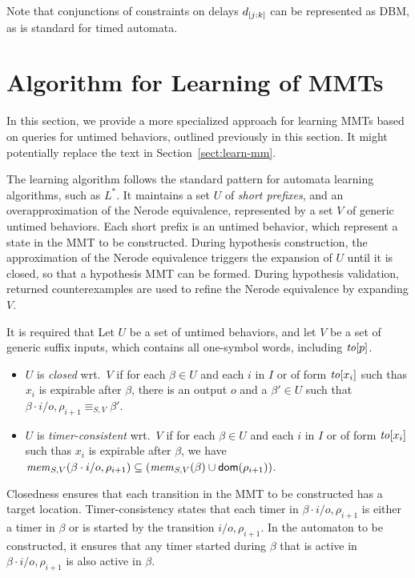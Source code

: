   Note that conjunctions of constraints on delays $\delay{j}{k}$ can be represented as DBM, as is standard for timed automata.

\section{Algorithm for Learning of MMTs}

In this section, we provide a more specialized approach for learning MMTs based
on queries for untimed behaviors, outlined previously in this section.
It might potentially replace the text in Section~\ref{sect:learn-mm}.

The learning algorithm follows the standard pattern for automata learning
algorithms, such as $L^*$. It maintains
a set $U$ of {\em short prefixes}, and
  an overapproximation of the Nerode equivalence,
  represented by a set $V$ of generic untimed behaviors.
  Each short prefix is an untimed
behavior, which represent a state in the MMT to be constructed.
During hypothesis construction,
the approximation of the Nerode equivalence triggers the expansion of
$U$ until it is closed, so that a hypothesis MMT can be formed.
During hypothesis validation, returned counterexamples are used to refine
the Nerode equivalence by expanding $V$.

It is required that 
Let $U$ be a set of untimed behaviors, and let $V$ be a set of generic suffix
inputs, which contains all one-symbol words, including $\toevent{p}$.
\begin{itemize}
\item
$U$ is {\em closed} wrt.\ $V$ if 
  for each $\beta \in U$ and each
  $i$ in $I$ or of form $\toevent{x_i}$ such thas $x_i$ is expirable
  after $\beta$,
  there is an output $o$ and a $\beta' \in U$ such that
  $\beta \cdot i/o,\rho_{i+1} \equiv_{S,V} \beta'$.
\item
$U$ is {\em timer-consistent} wrt.\ $V$ if 
  for each $\beta \in U$ and each
  $i$ in $I$ or of form $\toevent{x_i}$ such thas $x_i$ is expirable
  after $\beta$, we have
  $\getmemorable{S}{\beta \cdot i/o,\rho_{i+1}}{V} \subseteq
  (\getmemorable{S}{\beta}{V} \cup \domof{\rho_{i+1}})$.
\end{itemize}
Closedness ensures 
that each transition in the MMT to be constructed has a target location. 
Timer-consistency states that each timer in $\beta \cdot i/o,\rho_{i+1}$
is either a timer in $\beta$ or is started by the transition $i/o,\rho_{i+1}$.
In the automaton to be constructed, it ensures that
any timer started during $\beta$ that is active in $\beta \cdot i/o,\rho_{i+1}$
is also active in $\beta$.

